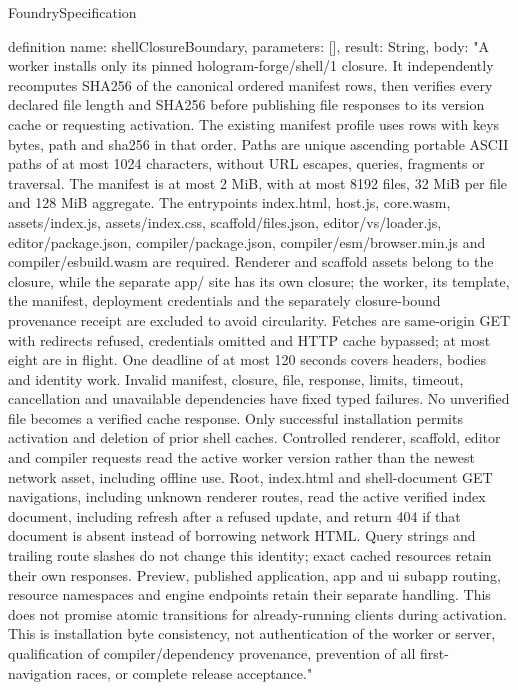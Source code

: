 \begin{lexlean}{FoundrySpecification}
\begin{semanticmodule}
definition{
  name: shellClosureBoundary,
  parameters: [],
  result: String,
  body: "A worker installs only its pinned hologram-forge/shell/1 closure. It independently recomputes SHA256 of the canonical ordered manifest rows, then verifies every declared file length and SHA256 before publishing file responses to its version cache or requesting activation. The existing manifest profile uses rows with keys bytes, path and sha256 in that order. Paths are unique ascending portable ASCII paths of at most 1024 characters, without URL escapes, queries, fragments or traversal. The manifest is at most 2 MiB, with at most 8192 files, 32 MiB per file and 128 MiB aggregate. The entrypoints index.html, host.js, core.wasm, assets/index.js, assets/index.css, scaffold/files.json, editor/vs/loader.js, editor/package.json, compiler/package.json, compiler/esm/browser.min.js and compiler/esbuild.wasm are required. Renderer and scaffold assets belong to the closure, while the separate app/ site has its own closure; the worker, its template, the manifest, deployment credentials and the separately closure-bound provenance receipt are excluded to avoid circularity. Fetches are same-origin GET with redirects refused, credentials omitted and HTTP cache bypassed; at most eight are in flight. One deadline of at most 120 seconds covers headers, bodies and identity work. Invalid manifest, closure, file, response, limits, timeout, cancellation and unavailable dependencies have fixed typed failures. No unverified file becomes a verified cache response. Only successful installation permits activation and deletion of prior shell caches. Controlled renderer, scaffold, editor and compiler requests read the active worker version rather than the newest network asset, including offline use. Root, index.html and shell-document GET navigations, including unknown renderer routes, read the active verified index document, including refresh after a refused update, and return 404 if that document is absent instead of borrowing network HTML. Query strings and trailing route slashes do not change this identity; exact cached resources retain their own responses. Preview, published application, app and ui subapp routing, resource namespaces and engine endpoints retain their separate handling. This does not promise atomic transitions for already-running clients during activation. This is installation byte consistency, not authentication of the worker or server, qualification of compiler/dependency provenance, prevention of all first-navigation races, or complete release acceptance."
}


\end{semanticmodule}
\end{lexlean}
